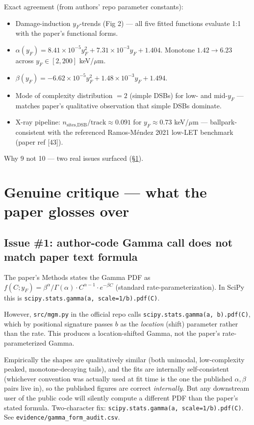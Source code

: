 \documentclass[11pt]{article}
\begin{document}
Exact agreement (from authors' repo parameter constants):
\begin{itemize}
\item Damage-induction $y_F$-trends (Fig 2) --- all five fitted functions
  evaluate 1:1 with the paper's functional forms.
\item $\alpha(y_F) = 8.41 \times 10^{-5} y_F^2 + 7.31 \times 10^{-3} y_F + 1.404$.
  Monotone $1.42 \to 6.23$ across $y_F \in [2, 200]$ keV/$\mu$m.
\item $\beta(y_F) = -6.62 \times 10^{-5} y_F^2 + 1.48 \times 10^{-3} y_F + 1.494$.
\item Mode of complexity distribution $= 2$ (simple DSBs) for low- and mid-$y_F$
  --- matches paper's qualitative observation that simple DSBs dominate.
\item X-ray pipeline: $n_{\text{sites,DSB}}/\text{track} \approx 0.091$ for
  $y_F \approx 0.73$ keV/$\mu$m --- ballpark-consistent with the referenced
  Ramos-M\'endez 2021 low-LET benchmark (paper ref [43]).
\end{itemize}

Why 9 not 10 --- two real issues surfaced (\S\ref{sec:critique}).

\section{Genuine critique --- what the paper glosses over}
\label{sec:critique}

\subsection{Issue \#1: author-code Gamma call does not match paper text formula}

The paper's Methods states the Gamma PDF as
$f(C; y_F) = \beta^\alpha / \Gamma(\alpha) \cdot C^{\alpha-1} \cdot e^{-\beta C}$
(standard rate-parameterization). In SciPy this is
\texttt{scipy.stats.gamma(a, scale=1/b).pdf(C)}.

However, \texttt{src/mgm.py} in the official repo calls
\texttt{scipy.stats.gamma(a, b).pdf(C)}, which by positional signature passes
$b$ as the \emph{location} (shift) parameter rather than the rate. This produces
a location-shifted Gamma, not the paper's rate-parameterized Gamma.

Empirically the shapes are qualitatively similar (both unimodal, low-complexity
peaked, monotone-decaying tails), and the fits are internally self-consistent
(whichever convention was actually used at fit time is the one the published
$\alpha, \beta$ pairs live in), so the published figures are correct
\emph{internally}. But any downstream user of the public code will silently
compute a different PDF than the paper's stated formula. Two-character fix:
\texttt{scipy.stats.gamma(a, scale=1/b).pdf(C)}. See
\texttt{evidence/gamma\_form\_audit.csv}.
\end{document}
